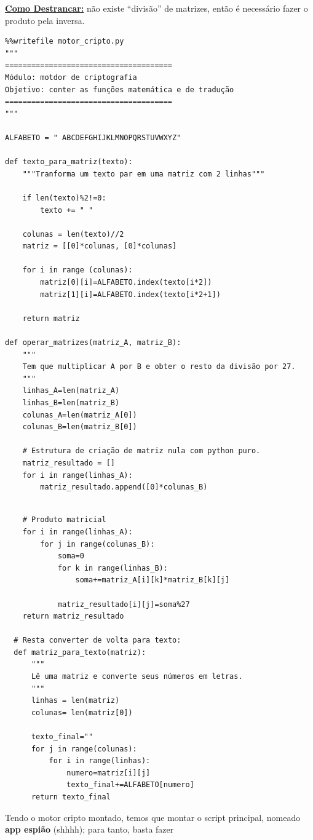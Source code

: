 \documentclass[../numerical_methods.tex]{subfiles}
\begin{document}
\textbf{\underline{Como Destrancar:}} não existe ``divisão'' de matrizes, então é necessário fazer o produto pela inversa.
\begin{listing}[H]
	\begin{verbatim}
%%writefile motor_cripto.py 
"""
====================================== 
Módulo: motdor de criptografia 
Objetivo: conter as funções matemática e de tradução 
======================================
"""

ALFABETO = " ABCDEFGHIJKLMNOPQRSTUVWXYZ"

def texto_para_matriz(texto):
    """Tranforma um texto par em uma matriz com 2 linhas"""

    if len(texto)%2!=0:
        texto += " "

    colunas = len(texto)//2 
    matriz = [[0]*colunas, [0]*colunas]

    for i in range (colunas):
        matriz[0][i]=ALFABETO.index(texto[i*2])
        matriz[1][i]=ALFABETO.index(texto[i*2+1])

    return matriz

def operar_matrizes(matriz_A, matriz_B):
    """
    Tem que multiplicar A por B e obter o resto da divisão por 27.
    """
    linhas_A=len(matriz_A)
    linhas_B=len(matriz_B)
    colunas_A=len(matriz_A[0])
    colunas_B=len(matriz_B[0])

    # Estrutura de criação de matriz nula com python puro.
    matriz_resultado = []
    for i in range(linhas_A):
        matriz_resultado.append([0]*colunas_B)
\end{verbatim}
\end{listing}

\begin{verbatim}

    # Produto matricial 
    for i in range(linhas_A):
        for j in range(colunas_B):
            soma=0
            for k in range(linhas_B):
                soma+=matriz_A[i][k]*matriz_B[k][j] 

            matriz_resultado[i][j]=soma%27
    return matriz_resultado

  # Resta converter de volta para texto: 
  def matriz_para_texto(matriz):
      """
      Lê uma matriz e converte seus números em letras.
      """
      linhas = len(matriz)
      colunas= len(matriz[0])

      texto_final=""
      for j in range(colunas):
          for i in range(linhas):
              numero=matriz[i][j]
              texto_final+=ALFABETO[numero]
      return texto_final
\end{verbatim}
Tendo o motor cripto montado, temos que montar o script principal, nomeado \textbf{app espião} (shhhh); para tanto, basta fazer
\end{document}
